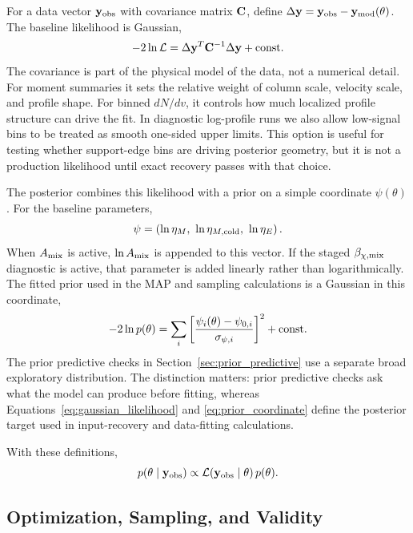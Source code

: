 For a data vector ${\bf y}_{\rm obs}$ with covariance matrix ${\bf C}$, define
$\Delta{\bf y}={\bf y}_{\rm obs}-{\bf y}_{\rm mod}(\theta)$.  The baseline
likelihood is Gaussian,
\begin{equation}
-2\ln {\cal L}
=
\Delta{\bf y}^T{\bf C}^{-1}\Delta{\bf y}
+ {\rm const}.
\label{eq:gaussian_likelihood}
\end{equation}
The covariance is part of the physical model of the data, not a numerical
detail.  For moment summaries it sets the relative weight of column scale,
velocity scale, and profile shape.  For binned $dN/dv$, it controls how much
localized profile structure can drive the fit.  In diagnostic log-profile runs
we also allow low-signal bins to be treated as smooth one-sided upper limits.
This option is useful for testing whether support-edge bins are driving
posterior geometry, but it is not a production likelihood until exact recovery
passes with that choice.

The posterior combines this likelihood with a prior on a simple coordinate
$\psi(\theta)$.  For the baseline parameters,
\begin{equation}
\psi =
\left(\ln\eta_M,\ \ln\eta_{M,\rm cold},\ \ln\eta_E\right).
\end{equation}
When $A_{\rm mix}$ is active, $\ln A_{\rm mix}$ is appended to this vector.  If
the staged $\beta_{\chi,\rm mix}$ diagnostic is active, that parameter is added
linearly rather than logarithmically.  The fitted prior used in the MAP and
sampling calculations is a Gaussian in this coordinate,
\begin{equation}
-2\ln p(\theta)
=
\sum_i
\left[
{\psi_i(\theta)-\psi_{0,i}\over \sigma_{\psi,i}}
\right]^2
+{\rm const}.
\label{eq:prior_coordinate}
\end{equation}
The prior predictive checks in Section~\ref{sec:prior_predictive} use a
separate broad exploratory distribution.  The distinction matters: prior
predictive checks ask what the model can produce before fitting, whereas
Equations~\ref{eq:gaussian_likelihood} and \ref{eq:prior_coordinate} define the
posterior target used in input-recovery and data-fitting calculations.

With these definitions,
\begin{equation}
p(\theta\mid{\bf y}_{\rm obs})
\propto
{\cal L}({\bf y}_{\rm obs}\mid\theta)\,
p(\theta).
\end{equation}

\subsection{Optimization, Sampling, and Validity}
\label{subsec:inference_sampling}

